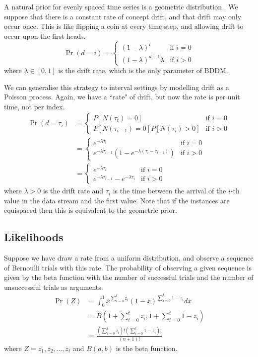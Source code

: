 A natural prior for evenly spaced time series is a geometric distribution \cite{fearnhead}\cite{BCMC}. We suppose that there is a constant rate of concept drift, and that drift may only occur once. This is like flipping a coin at every time step, and allowing drift to occur upon the first heads.
\begin{equation}
  \Pr(d=i) = \begin{cases}
  (1-\lambda)^t & \text{if }i=0 \\
  (1-\lambda)^{d-1}\lambda & \text{if }i>0
  \end{cases}
\end{equation}
where $\lambda \in [0,1]$ is the drift rate, which is the only parameter of BDDM.

We can generalise this strategy to interval settings by modelling drift as a Poisson process. Again, we have a ``rate" of drift, but now the rate is per unit time, not per index.
\begin{align}
  \Pr(d=\tau_i) &= \begin{cases}
  P[N(\tau_t)=0]& \text{if }i=0 \\
  P[N(\tau_{i-1})=0]P[N(\tau_i)>0] & \text{if }i>0
  \end{cases} \\
  &= \begin{cases}
  e^{-\lambda\tau_t} & \text{if }i=0 \\
  e^{-\lambda \tau_{i-1}}\left(1-e^{-\lambda(\tau_i-\tau_{i-1})}\right) & \text{if }i>0
  \end{cases} \\
  &= \begin{cases}
  e^{-\lambda\tau_t} & \text{if }i=0 \\
  e^{-\lambda \tau_{i-1}} - e^{-\lambda \tau_i} & \text{if }i>0 \label{eq:prior}
  \end{cases}
\end{align}
where $\lambda > 0$ is the drift rate and $\tau_i$ is the time between the arrival of the $i$-th value in the data stream and the first value. Note that if the instances are equispaced then this is equivalent to the geometric prior.

\subsection{Likelihoods}

Suppose we have draw a rate from a uniform distribution, and observe a sequence of Bernoulli trials with this rate. The probability of observing a given sequence is given by the beta function with the number of successful trials and the number of unsuccessful trials as arguments.
\begin{align}
  \Pr(Z) &= \int_0^1 x^{\sum_{i=0}^t z_i}(1-x)^{\sum_{i=0}^t 1-z_i} dx \\
  &= B\left(1+\sum_{i=0}^t z_i,1+\sum_{i=0}^t 1-z_i\right) \\
  &= \frac{\left(\sum_{i=0}^t z_i\right)! \left(\sum_{i=0}^t 1-z_i\right)!}{(n+1)!}
\end{align}
where $Z = z_1,z_2,\dots,z_t$ and $B(a,b)$ is the beta function.


